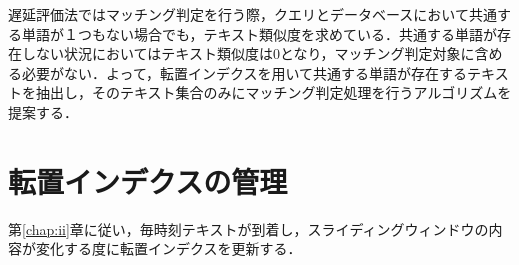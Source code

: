 遅延評価法ではマッチング判定を行う際，クエリとデータベースにおいて共通する単語が１つもない場合でも，テキスト類似度を求めている．共通する単語が存在しない状況においてはテキスト類似度は0となり，マッチング判定対象に含める必要がない．よって，転置インデクスを用いて共通する単語が存在するテキストを抽出し，そのテキスト集合のみにマッチング判定処理を行うアルゴリズムを提案する．

\section{転置インデクスの管理}
\begin{comment}
静的なテキスト集合に対する転置インデクスは一度構築すれば更新する必要はない．しかし，本研究では動的なテキスト集合を扱うため，動的なテキスト集合に適した転置インデクスの構築・更新が必要になる．そのため，転置インデクスのデータ構造を以下の通りとする．
\begin{itemize}
    \item 転置インデクスをハッシュテーブルとし，それぞれの単語にテキストIDを含むキューを対応させる．
    \item 新しいテキストが到着したとき，ハッシュテーブルを参照し，新しいテキストに含まれるすべての単語に対応するキューの先頭にテキスト情報を追加する．
    \item 最も古いテキストを除外するとき，ハッシュテーブルを参照し，古いテキストに含まれるすべての単語に対応するキューの末尾のテキスト情報を削除する．
\end{itemize}
\par
ひとつのテキスト内にある単語が複数含まれている時，その単語の個数分キューにテキストIDを追加するのではなく，テキストを識別するためのテキストIDとその単語の個数をもつデータをキューに格納することとし，このデータをテキスト情報とする．
\end{comment}

第\ref{chap:ii}章に従い，毎時刻テキストが到着し，スライディングウィンドウの内容が変化する度に転置インデクスを更新する．

